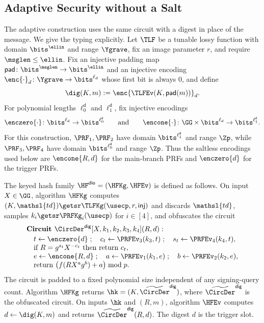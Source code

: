 \subsection{Adaptive Security without a Salt} \label{sec-derand-adaptive}

The adaptive construction uses the same circuit with a digest in place of the message. We give the typing explicitly. Let $\TLF$ be a tunable lossy function with domain $\bits^{\ellin}$ and range $\Ygrave$, fix an image parameter $r$, and require $\msglen\le\ellin$. Fix an injective padding map $\mathsf{pad}\colon\bits^{\msglen}\to\bits^{\ellin}$ and an injective encoding $\enc{\cdot}_d\colon\Ygrave\to\bits^{\ell_d}$ whose first bit is always 0, and define
$$
\dig(K,m):=\enc{\TLFEv(K,\mathsf{pad}(m))}_d.
$$
For polynomial lengths $\ell^{\mathsf d}_0$ and $\ell^{\mathsf d}_1$, fix injective encodings
$$
\enczero{\cdot}\colon\bits^{\ell_d}\to\bits^{\ell^{\mathsf d}_0}
\qquad\text{and}\qquad
\encone{\cdot}\colon\GG\times\bits^{\ell_d}\to\bits^{\ell^{\mathsf d}_1}.
$$
For this construction, $\PRF_1,\PRF_2$ have domain $\bits^{\ell^{\mathsf d}_1}$ and range $\Zp$, while $\PRF_3,\PRF_4$ have domain $\bits^{\ell^{\mathsf d}_0}$ and range $\Zp$. Thus the saltless encodings used below are $\encone{R,d}$ for the main-branch PRFs and $\enczero{d}$ for the trigger PRFs.

\begin{construction} \label{constr-dio}
The keyed hash family $\HF^{\mathsf{dio}}=(\HFKg,\HFEv)$ is defined as follows. On input $X\in\GG$, algorithm $\HFKg$ computes $(K,\mathsl{td})\getsr\TLFKg(\usecp,r,\mathsf{inj})$ and discards $\mathsl{td}$, samples $k_i\getsr\PRFKg_i(\usecp)$ for $i\in[4]$, and obfuscates the circuit
$$
\begin{array}{ll}
\textbf{Circuit }\CircDer^{\mathsf{dig}}[X,k_1,k_2,k_3,k_4](R,d):\\[2pt]
\quad t\gets\enczero{d}\;;\quad c_t\gets\PRFEv_3(k_3,t)\;;\quad s_t\gets\PRFEv_4(k_4,t),\\
\quad\text{if }R=g^{s_t}X^{-c_t}\text{ then return }c_t,\\
\quad e\gets\encone{R,d}\;;\quad a\gets\PRFEv_1(k_1,e)\;;\quad b\gets\PRFEv_2(k_2,e),\\
\quad\text{return }\big(f(RX^ag^b)+a\big)\bmod p.
\end{array}
$$
The circuit is padded to a fixed polynomial size independent of any signing-query count. Algorithm $\HFKg$ returns $\hk=(K,\widetilde{\CircDer}^{\mathsf{dig}})$, where $\widetilde{\CircDer}^{\mathsf{dig}}$ is the obfuscated circuit. On inputs $\hk$ and $(R,m)$, algorithm $\HFEv$ computes $d\gets\dig(K,m)$ and returns $\widetilde{\CircDer}^{\mathsf{dig}}(R,d)$. The digest $d$ is the trigger slot.
\end{construction}


